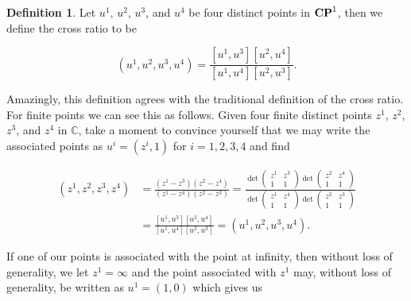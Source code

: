 \documentclass{amsart}
\theoremstyle{theorem}
\theoremstyle{lemma}
\theoremstyle{definition}
\newtheorem*{definition}{Definition}
\begin{document}
\begin{definition}
Let $u^1$, $u^2$, $u^3$, and $u^4$ be four distinct points in  ${\bf CP}^1$, then we define the cross ratio to be

$$(u^1, u^2, u^3, u^4)=\frac{[u^1,u^3][u^2,u^4]}{[u^1,u^4][u^2,u^3]}.$$

\end{definition}

Amazingly, this definition agrees with the traditional definition of the cross ratio. For finite points we can see this as follows. Given four finite distinct points $z^1$, $z^2$, $z^3$, and $z^4$ in $\mathbb{C}$, take a moment to convince yourself that we may write the associated points as $u^i=(z^i, 1)$ for $i=1,2,3,4$ and find 

\begin{align*}(z^1, z^2, z^3, z^4)&=\frac{(z^1-z^3)(z^2-z^4)}{(z^1-z^4)(z^2-z^3)}=\frac{\det \begin{pmatrix}
z^1 & z^3\\ 
1 & 1 
\end{pmatrix}\det \begin{pmatrix}
z^2 & z^4\\ 
1 & 1 
\end{pmatrix}}{\det \begin{pmatrix}
z^1 & z^4\\ 
1 & 1 
\end{pmatrix}\det \begin{pmatrix}
z^2 & z^3 \\ 
1 & 1 
\end{pmatrix}}\\
&=\frac{[u^1,u^3][u^2,u^4]}{[u^1,u^4][u^2,u^3]}=(u^1,u^2,u^3,u^4).
\end{align*}

If one of our points is associated with the point at infinity, then without loss of generality, we let $z^1=\infty$ and the point associated with $z^1$ may, without loss of generality, be written as $u^1=(1,0)$ which gives us
\end{document}
